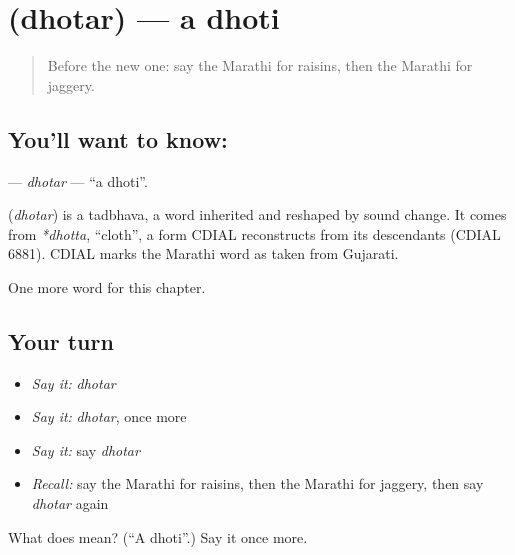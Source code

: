 \section[\texorpdfstring{\mr{धोतर} (dhotar)}{धोतर (dhotar)}]{ (dhotar) — a dhoti}

\label{lesson:MR-C270-dhotar}



\begin{quote}
Before the new one: say the Marathi for raisins, then the Marathi for jaggery.
\end{quote}

\subsection*{You'll want to know: }
\textbf{} — \emph{dhotar} — \textquotedblleft{}a dhoti\textquotedblright{}.

\begin{cousinweb}
\textbf{} (\emph{dhotar}) is a tadbhava, a word inherited and reshaped by sound change. It comes from \emph{*dhotta}, \textquotedblleft{}cloth\textquotedblright{}, a form CDIAL reconstructs from its descendants (CDIAL 6881). CDIAL marks the Marathi word as taken from Gujarati.
\end{cousinweb}

\begin{grammarlens}[title={What you've built}]
One more word for this chapter.
\end{grammarlens}

\subsection*{Your turn}
\begin{itemize}
\raggedright
  \item \emph{Say it:} \emph{dhotar}
  \item \emph{Say it:} \emph{dhotar}, once more
  \item \emph{Say it:} say \emph{dhotar}
  \item \emph{Recall:} say the Marathi for raisins, then the Marathi for jaggery, then say \emph{dhotar} again
\end{itemize}

\begin{tcolorbox}[breakable,colback=teal!4,colframe=teal!35!black,title={Before you move on}]
What does  mean? (\textquotedblleft{}A dhoti\textquotedblright{}.) Say it once more.
\end{tcolorbox}

